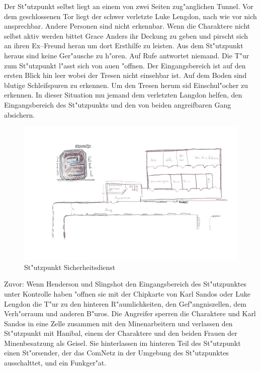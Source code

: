 Der St"utzpunkt selbst liegt an einem von zwei Seiten zug"anglichen Tunnel. Vor dem geschlossenen Tor liegt der schwer verletzte Luke Lengdon, nach wie vor nich ansprechbar. Andere Personen sind nicht erkennbar. Wenn die Charaktere nicht selbst aktiv werden bittet Grace Anders ihr Deckung zu geben und pirscht sich an ihren Ex--Freund heran um dort Ersthilfe zu leisten. Aus dem St"utzpunkt heraus sind keine Ger"ausche zu h"oren. Auf Rufe antwortet niemand. Die T"ur zum St"utzpunkt l"asst sich von au\3en "offnen. Der Eingangsbereich ist auf den ersten Blick hin leer wobei der Tresen nicht einsehbar ist. Auf dem Boden sind blutige Schleifspuren zu erkennen. Um den Tresen herum sid Einschu\3l"ocher zu erkennen. In dieser Situation mu\3 jemand dem verletzten Langdon helfen, den Eingangsbereich des St"utzpunkts und den von beiden angreifbaren Gang absichern. 

\begin{figure}[htbp]
	\centering
	\includegraphics[width=0.9\linewidth]{./images/sicherheitdienst.png}
    \newline{}St"utzpunkt Sicherheitsdienst
	\label{fig:stuetzpunkt-sicherheitsdienst}
\end{figure}

Zuvor: Wenn Henderson und Slingshot den Eingangsbereich des St"utzpunktes unter Kontrolle haben "offnen sie mit der Chipkarte von Karl Sandos oder Luke Lengdon die T"ur zu den hinteren R"aumlichkeiten, den Gef"angniszellen, dem Verh"orraum und anderen B"uros. Die Angreifer sperren die Charaktere und Karl Sandos in eine Zelle zusammen mit den Minenarbeitern und verlassen den St"utzpunkt mit Hanibal, einem der Charaktere und den beiden Frauen der Minenbesatzung als Geisel. Sie hinterlassen im hinteren Teil des St"utzpunkt einen St"orsender, der das ComNetz in der Umgebung des St"utzpunktes ausschalttet, und ein Funkger"at.  

